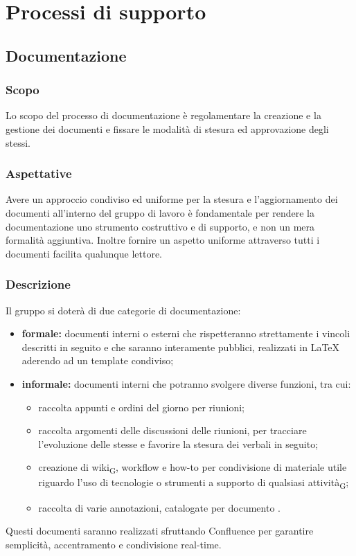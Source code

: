 \section{Processi di supporto}
\label{supporto}
\subsection{Documentazione}
    \subsubsection{Scopo}
    Lo scopo del processo di documentazione è regolamentare la creazione e la gestione dei documenti e fissare le modalità di stesura ed approvazione degli stessi.
    \subsubsection{Aspettative}
    Avere un approccio condiviso ed uniforme per la stesura e l'aggiornamento dei documenti all'interno del gruppo di lavoro è fondamentale per rendere la documentazione uno strumento costruttivo e di supporto, e non un mera formalità aggiuntiva.
    Inoltre fornire un aspetto uniforme attraverso tutti i documenti facilita qualunque lettore.
    \subsubsection{Descrizione}
    Il gruppo \group si doterà di due categorie di documentazione:
    \begin{itemize}
        \item \textbf{formale: }documenti interni o esterni che rispetteranno strettamente i vincoli descritti in seguito e che saranno interamente pubblici, realizzati in \LaTeX{} aderendo ad un template condiviso;
        \item \textbf{informale: }documenti interni che potranno svolgere diverse funzioni, tra cui:
        \begin{itemize}
            \item  raccolta appunti e ordini del giorno per riunioni;
            \item  raccolta argomenti delle discussioni delle riunioni, per tracciare l'evoluzione delle stesse e favorire la stesura dei verbali in seguito;
            \item  creazione di wiki\textsubscript{G}, workflow e how-to per condivisione di materiale utile riguardo l'uso di tecnologie o strumenti a supporto di qualsiasi attività\textsubscript{G};
            \item raccolta di varie annotazioni, catalogate per documento .
        \end{itemize}
    \end{itemize}
    Questi documenti saranno realizzati sfruttando Confluence per garantire semplicità, accentramento e condivisione real-time.
